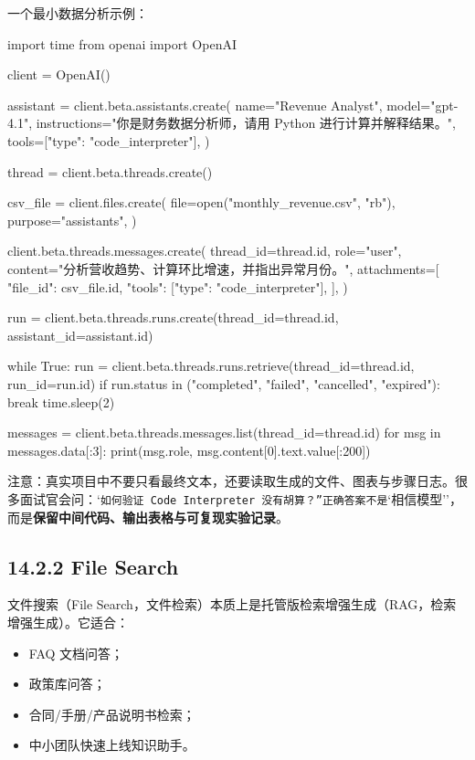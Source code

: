 一个最小数据分析示例：


\begin{codeblock}
import time
from openai import OpenAI

client = OpenAI()

assistant = client.beta.assistants.create(
    name="Revenue Analyst",
    model="gpt-4.1",
    instructions="你是财务数据分析师，请用 Python 进行计算并解释结果。",
    tools=[{"type": "code_interpreter"}],
)

thread = client.beta.threads.create()

csv_file = client.files.create(
    file=open("monthly_revenue.csv", "rb"),
    purpose="assistants",
)

client.beta.threads.messages.create(
    thread_id=thread.id,
    role="user",
    content="分析营收趋势、计算环比增速，并指出异常月份。",
    attachments=[{
        "file_id": csv_file.id,
        "tools": [{"type": "code_interpreter"}],
    }],
)

run = client.beta.threads.runs.create(thread_id=thread.id, assistant_id=assistant.id)

while True:
    run = client.beta.threads.runs.retrieve(thread_id=thread.id, run_id=run.id)
    if run.status in ("completed", "failed", "cancelled", "expired"):
        break
    time.sleep(2)

messages = client.beta.threads.messages.list(thread_id=thread.id)
for msg in messages.data[:3]:
    print(msg.role, msg.content[0].text.value[:200])
\end{codeblock}

注意：真实项目中不要只看最终文本，还要读取生成的文件、图表与步骤日志。很多面试官会问：`\texttt{如何验证 Code Interpreter 没有胡算？''正确答案不是}`相信模型''，而是\textbf{保留中间代码、输出表格与可复现实验记录}。


\subsection{14.2.2 File Search}

文件搜索（File Search，文件检索）本质上是托管版检索增强生成（RAG，检索增强生成）。它适合：


\begin{itemize}[leftmargin=2em]
\item FAQ 文档问答；
\item 政策库问答；
\item 合同/手册/产品说明书检索；
\item 中小团队快速上线知识助手。
\end{itemize}

